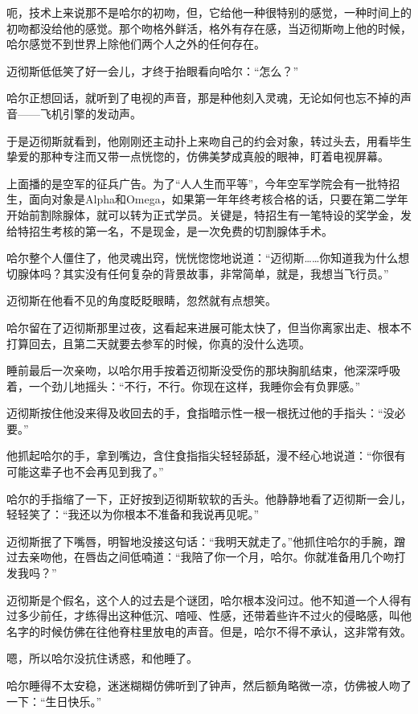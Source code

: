 \documentclass[../main]{subfiles}
\begin{document}
呃，技术上来说那不是哈尔的初吻，但，它给他一种很特别的感觉，一种时间上的初吻都没给他的感觉。那个吻格外鲜活，格外有存在感，当迈彻斯吻上他的时候，哈尔感觉不到世界上除他们两个人之外的任何存在。

迈彻斯低低笑了好一会儿，才终于抬眼看向哈尔：“怎么？”

哈尔正想回话，就听到了电视的声音，那是种他刻入灵魂，无论如何也忘不掉的声音——飞机引擎的发动声。

于是迈彻斯就看到，他刚刚还主动扑上来吻自己的约会对象，转过头去，用看毕生挚爱的那种专注而又带一点恍惚的，仿佛美梦成真般的眼神，盯着电视屏幕。

上面播的是空军的征兵广告。为了“人人生而平等”，今年空军学院会有一批特招生，面向对象是Alpha和Omega，如果第一年年终考核合格的话，只要在第二学年开始前割除腺体，就可以转为正式学员。关键是，特招生有一笔特设的奖学金，发给特招生考核的第一名，不是现金，是一次免费的切割腺体手术。

哈尔整个人僵住了，他灵魂出窍，恍恍惚惚地说道：“迈彻斯……你知道我为什么想切腺体吗？其实没有任何复杂的背景故事，非常简单，就是，我想当飞行员。”

迈彻斯在他看不见的角度眨眨眼睛，忽然就有点想笑。

哈尔留在了迈彻斯那里过夜，这看起来进展可能太快了，但当你离家出走、根本不打算回去，且第二天就要去参军的时候，你真的没什么选项。

睡前最后一次亲吻，以哈尔用手按着迈彻斯没受伤的那块胸肌结束，他深深呼吸着，一个劲儿地摇头：“不行，不行。你现在这样，我睡你会有负罪感。”

迈彻斯按住他没来得及收回去的手，食指暗示性一根一根抚过他的手指头：“没必要。”

他抓起哈尔的手，拿到嘴边，含住食指指尖轻轻舔舐，漫不经心地说道：“你很有可能这辈子也不会再见到我了。”

哈尔的手指缩了一下，正好按到迈彻斯软软的舌头。他静静地看了迈彻斯一会儿，轻轻笑了：“我还以为你根本不准备和我说再见呢。”

迈彻斯抿了下嘴唇，明智地没接这句话：“我明天就走了。”他抓住哈尔的手腕，蹭过去亲吻他，在唇齿之间低喃道：“我陪了你一个月，哈尔。你就准备用几个吻打发我吗？”

迈彻斯是个假名，这个人的过去是个谜团，哈尔根本没问过。他不知道一个人得有过多少前任，才练得出这种低沉、喑哑、性感，还带着些许不过火的侵略感，叫他名字的时候仿佛在往他脊柱里放电的声音。但是，哈尔不得不承认，这非常有效。

嗯，所以哈尔没抗住诱惑，和他睡了。

哈尔睡得不太安稳，迷迷糊糊仿佛听到了钟声，然后额角略微一凉，仿佛被人吻了一下：“生日快乐。”
\end{document}
